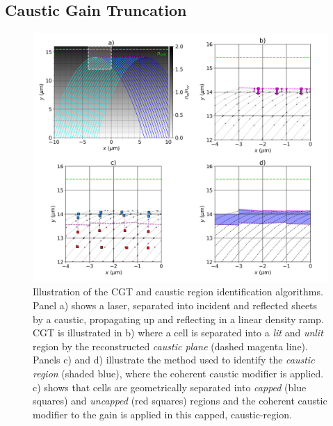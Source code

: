 \subsection{Caustic Gain Truncation}%
\label{sec:SOLAS_caustic_gain_truncation}

\begin{figure}[t!]
    \includegraphics[width=1.0\linewidth]{Numerics/Images/caustic_region_diagram.png}
    \centering
    \caption{Illustration of the \ac{CGT} and caustic region identification algorithms.
    Panel a) shows a laser, separated into incident and reflected sheets by a caustic, propagating up and reflecting in a linear density ramp.
    \ac{CGT} is illustrated in b) where a cell is separated into a \textit{lit} and \textit{unlit} region by the reconstructed \textit{caustic plane} (dashed magenta line).
    Panels c) and d) illustrate the method used to identify the \textit{caustic region} (shaded blue), where the coherent caustic modifier is applied.
    c) shows that cells are geometrically separated into \textit{capped} (blue squares) and \textit{uncapped} (red squares) regions and the coherent caustic modifier to the gain is applied in this capped, caustic-region.}%
    \label{fig:SOLAS_caustic_region}
\end{figure}

